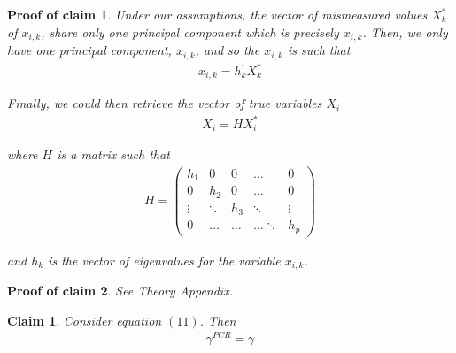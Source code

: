 \documentclass[10pt]{article}
\newtheorem{claim}{Claim}
\newtheorem{claimproof}{Proof of claim}[claim]
\begin{document}
        \begin{claimproof}
        Under our assumptions, the vector of mismeasured values $X^*_k$ of $x_{i,k}$, share only one principal component which is precisely $x_{i,k}$. Then, we only have one principal component, $x_{i,k}$, and so the $x_{i,k}$ is such that
                \begin{align}
                    x_{i,k}=h_{k}^{\prime} X^*_k
                \end{align}
                
                Finally, we could then retrieve the vector of true variables $X_i$
                \begin{align}
                    X_i=HX^*_i
                \end{align}
                
                where $H$ is a matrix such that
                \begin{align*}
                    H=\left(\begin{array}{ccccc}
                h_1 & 0 & 0 & \dots & 0 \\
                0 & h_2 & 0 & \dots & 0 \\
                \vdots & \ddots & h_3 & \ddots & \vdots \\
                0 & \dots & \dots & \dots \ddots & h_p
                \end{array}\right)
                \end{align*}
                
                and $h_k$ is the vector of eigenvalues for the variable $x_{i,k}$.
        \end{claimproof}

        \begin{claimproof}
        See Theory Appendix.
        \end{claimproof}
        
        \begin{claim}
        Consider equation $(11)$. Then
        \begin{align}
        {\gamma}^{PCR} = \gamma
        \end{align}
        \end{claim}
\end{document}
